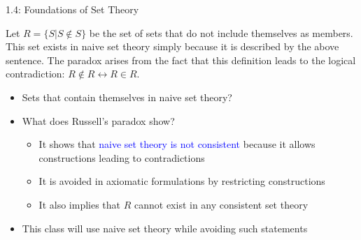 \documentclass[10pt,english,aspectratio=169]{beamer}
\begin{document}
\begin{frame}{1.4: Foundations of Set Theory}

\begin{example}
Let $R = \{S|S\notin S\}$ be the set of sets that do not include themselves as members.
This set exists in naive set theory simply because it is described by the above sentence.
The paradox arises from the fact that this definition leads to the logical contradiction: $R\notin R \leftrightarrow R\in R$.
\end{example}

\vspace{-3mm}

\begin{itemize}
\setlength\itemsep{3mm}
\item<2-> Sets that contain themselves in naive set theory? \vspace{2mm}
 
\item<3-> What does Russell's paradox show? \vspace{1mm}
\begin{itemize} 
  \setlength\itemsep{1.5mm}
  \item It shows that \textcolor{blue}{naive set theory is not consistent} because it allows constructions leading to contradictions
  \item It is avoided in axiomatic formulations by restricting constructions
  \item It also implies that $R$ cannot exist in any consistent set theory
\end{itemize}

\item<4-> This class will use naive set theory while avoiding such statements

\end{itemize}



\end{frame}
\end{document}
